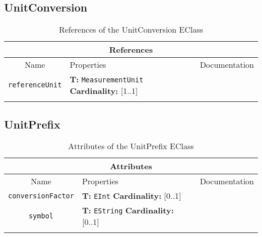 \documentclass{article}
\begin{document}
\subsection[UnitConversion]{UnitConversion}
\label{e4smUnitConversion}

\begin{table}[H]
\footnotesize
\begin{tabularx}{\textwidth}{|c| p{4 cm} | X |}
\hline
\multicolumn{3}{|c|}{\textbf{References}} \\
\hline
Name & Properties & Documentation \\ \hline \hline
\texttt{referenceUnit}
 & 
\textbf{T:} \texttt{MeasurementUnit}
\newline
\textbf{Cardinality:} [1..1]
 & \\ \hline
\caption{References of the UnitConversion EClass}
\end{tabularx}
\label{e4smUnitConversionref}
\end{table}
\subsection[UnitPrefix]{UnitPrefix}
\label{e4smUnitPrefix}

\begin{table}[H]
\footnotesize
\begin{tabularx}{\textwidth}{|c| p{4 cm} | X |}
\hline
\multicolumn{3}{|c|}{\textbf{Attributes}} \\
\hline
Name & Properties & Documentation \\ \hline \hline
\texttt{conversionFactor}
 & 
\textbf{T:} \texttt{EInt}
\newline
\textbf{Cardinality:} [0..1]
 & \\ \hline
\texttt{symbol}
 & 
\textbf{T:} \texttt{EString}
\newline
\textbf{Cardinality:} [0..1]
 & \\ \hline
\caption{Attributes of the UnitPrefix EClass}
\end{tabularx}
\label{e4smUnitPrefixattr}
\end{table}
\end{document}
